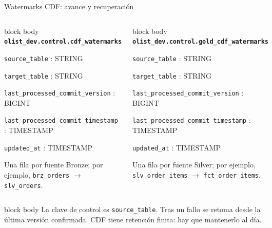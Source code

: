 \documentclass[aspectratio=169,10pt]{beamer}
\begin{document}
\begin{frame}{Watermarks CDF: avance y recuperación}
  \begin{columns}[T,onlytextwidth]
      \begin{beamercolorbox}[rounded=true,sep=.45em,wd=\linewidth]{block body}
        \centering\small\textbf{\texttt{olist\_dev.control.cdf\_watermarks}}\par
        \vspace{.2em}
        \scriptsize\texttt{source\_table} : STRING\par
        \texttt{target\_table} : STRING\par
        \texttt{last\_processed\_commit\_version} : BIGINT\par
        \texttt{last\_processed\_commit\_timestamp} : TIMESTAMP\par
        \texttt{updated\_at} : TIMESTAMP\par
        \vspace{.15em}
        \tiny Una fila por fuente Bronze; por ejemplo, \texttt{brz\_orders} $\rightarrow$ \texttt{slv\_orders}.
      \end{beamercolorbox}
      \begin{beamercolorbox}[rounded=true,sep=.45em,wd=\linewidth]{block body}
        \centering\small\textbf{\texttt{olist\_dev.control.gold\_cdf\_watermarks}}\par
        \vspace{.2em}
        \scriptsize\texttt{source\_table} : STRING\par
        \texttt{target\_table} : STRING\par
        \texttt{last\_processed\_commit\_version} : BIGINT\par
        \texttt{last\_processed\_commit\_timestamp} : TIMESTAMP\par
        \texttt{updated\_at} : TIMESTAMP\par
        \vspace{.15em}
        \tiny Una fila por fuente Silver; por ejemplo, \texttt{slv\_order\_items} $\rightarrow$ \texttt{fct\_order\_items}.
      \end{beamercolorbox}
  \end{columns}
  \vspace{.4em}
  \vspace{.3em}
  \begin{beamercolorbox}[rounded=true,sep=.4em,wd=\linewidth]{block body}
    \centering\scriptsize La clave de control es \texttt{source\_table}. Tras un fallo se retoma
    desde la última versión confirmada. CDF tiene retención finita: hay que mantenerlo al día.
  \end{beamercolorbox}
\end{frame}
\end{document}
